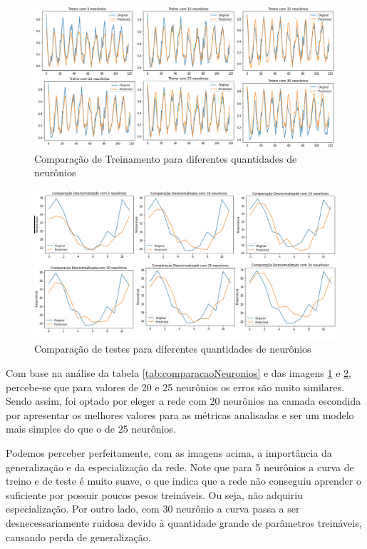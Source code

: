 \documentclass[12pt]{article}
\begin{document}
	\begin{figure}[H]
		\centering
		\includegraphics[width=0.9\linewidth]{Imagens/onestep/treinocomparadoneuronios}
		\caption{Comparação de Treinamento para diferentes quantidades de neurônios}
		\label{fig:treinocomparadoneuronios}
	\end{figure}
	\begin{figure}[H]
		\centering
		\includegraphics[width=0.9\linewidth]{Imagens/onestep/comparacaoneuronios.jpg}
		\caption{Comparação de testes para diferentes quantidades de neurônios}
		\label{fig:comparacaoneuronios}
	\end{figure}

	Com base na análise da tabela \ref{tab:comparacaoNeuronios} e das imagens \ref{fig:treinocomparadoneuronios} e \ref{fig:comparacaoneuronios}, percebe-se que para valores de 20 e 25 neurônios os erros são muito similares. Sendo assim, foi optado por eleger a rede com 20 neurônios na camada escondida por apresentar os melhores valores para as métricas analisadas e ser um modelo mais simples do que o de 25 neurônios.
	
	Podemos perceber perfeitamente, com as imagens acima, a importância da generalização e da especialização da rede. Note que para 5 neurônios a curva de treino e de teste é muito suave, o que indica que a rede não conseguiu aprender o suficiente por possuir poucos pesos treináveis. Ou seja, não adquiriu especialização. Por outro lado, com 30 neurônio a curva passa a ser desnecessariamente ruidosa devido à quantidade grande de parâmetros treináveis, causando perda de generalização.
	
\end{document}
